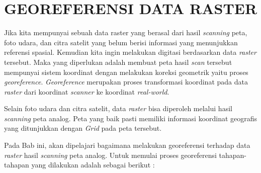 \chapter{GEOREFERENSI DATA RASTER}

Jika kita mempunyai sebuah data raster yang berasal dari hasil \textit{scanning} peta, foto udara, dan citra satelit yang belum berisi informasi yang menunjukkan referensi spasial. Kemudian kita ingin melakukan digitasi berdasarkan data \textit{raster} tersebut. Maka yang diperlukan adalah membuat peta hasil \textit{scan} tersebut mempunyai sistem koordinat dengan melakukan koreksi geometrik yaitu proses \textit{georeference}. \textit{Georeference} merupakan proses transformasi koordinat pada data \textit{raster} dari koordinat \textit{scanner} ke koordinat \textit{real-world}.

Selain foto udara dan citra satelit, data \textit{raster} bisa diperoleh melalui hasil \textit{scanning} peta analog. Peta yang baik pasti memiliki informasi koordinat geografis yang ditunjukkan dengan \textit{Grid} pada peta tersebut.

Pada Bab ini, akan dipelajari bagaimana melakukan georeferensi terhadap data \textit{raster} hasil \textit{scanning} peta analog. Untuk memulai proses georeferensi tahapan-tahapan yang dilakukan adalah sebagai berikut :

